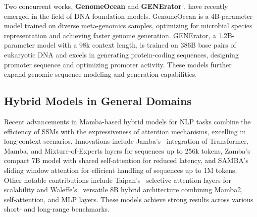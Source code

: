 Two concurrent works, \textbf{GenomeOcean} \cite{Zhou2025genomeocean} and \textbf{GENErator} \cite{wu2025generator}, have recently emerged in the field of DNA foundation models. GenomeOcean is a 4B-parameter model trained on diverse meta-genomics samples, optimizing for microbial species representation and achieving faster genome generation. GENErator, a 1.2B-parameter model with a 98k context length, is trained on 386B base pairs of eukaryotic DNA and excels in generating protein-coding sequences, designing promoter sequence and optimizing promoter activity. These models further expand genomic sequence modeling and generation capabilities.

\subsection{Hybrid Models in General Domains}
Recent advancements in Mamba-based hybrid models for NLP tasks combine the efficiency of SSMs with the expressiveness of attention mechanisms, excelling in long-context scenarios. Innovations include Jamba's~\citep{lieber2024jambahybridtransformermambalanguage} integration of Transformer, Mamba, and Mixture-of-Experts layers for sequences up to 256k tokens, 
Zamba's \citep{glorioso2024zambacompact7bssm} compact 7B model with shared self-attention for reduced latency, and SAMBA's~\citep{ren2024sambasimplehybridstate} sliding window attention for efficient handling of sequences up to 1M tokens. Other notable contributions include Taipan's~\citep{vannguyen2024taipanefficientexpressivestate} selective attention layers for scalability and Waleffe's~\citep{waleffe2024empirical} versatile 8B hybrid architecture combining Mamba2, self-attention, and MLP layers. These models achieve strong results across various short- and long-range benchmarks.
